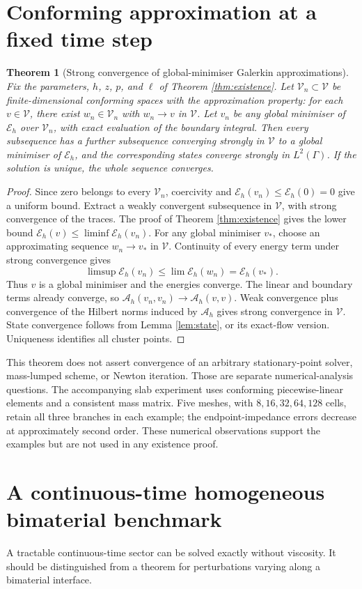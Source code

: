 \documentclass[11pt,a4paper]{article}
\newtheorem{theorem}{Theorem}[section]
\theoremstyle{definition}\newtheorem{definition}[theorem]{Definition}
\theoremstyle{remark}\newtheorem{remark}[theorem]{Remark}
\newcommand{\A}{\mathcal A}
\newcommand{\E}{\mathcal E}
\newcommand{\V}{\mathcal V}
\numberwithin{equation}{section}
\begin{document}
\section{Conforming approximation at a fixed time step}\label{sec:Galerkin}
\begin{theorem}[Strong convergence of global-minimiser Galerkin approximations]\label{thm:Galerkin}
Fix the parameters, $h$, $z$, $p$, and $\ell$ of Theorem \ref{thm:existence}. Let $\V_n\subset\V$ be finite-dimensional conforming spaces with the approximation property: for each $v\in\V$, there exist $w_n\in\V_n$ with $w_n\to v$ in $\V$. Let $v_n$ be any global minimiser of $\E_h$ over $\V_n$, with exact evaluation of the boundary integral. Then every subsequence has a further subsequence converging strongly in $\V$ to a global minimiser of $\E_h$, and the corresponding states converge strongly in $L^2(\Gamma)$. If the solution is unique, the whole sequence converges.
\end{theorem}
\begin{proof}
Since zero belongs to every $\V_n$, coercivity and $\E_h(v_n)\le\E_h(0)=0$ give a uniform bound. Extract a weakly convergent subsequence in $\V$, with strong convergence of the traces. The proof of Theorem \ref{thm:existence} gives the lower bound
$\E_h(v)\le\liminf\E_h(v_n)$.
For any global minimiser $v_*$, choose an approximating sequence $w_n\to v_*$ in $\V$. Continuity of every energy term under strong convergence gives
\[
 \limsup\E_h(v_n)\le\lim\E_h(w_n)=\E_h(v_*).
\]
Thus $v$ is a global minimiser and the energies converge. The linear and boundary terms already converge, so $\A_h(v_n,v_n)\to\A_h(v,v)$. Weak convergence plus convergence of the Hilbert norms induced by $\A_h$ gives strong convergence in $\V$. State convergence follows from Lemma \ref{lem:state}, or its exact-flow version. Uniqueness identifies all cluster points.
\end{proof}
This theorem does not assert convergence of an arbitrary stationary-point solver, mass-lumped scheme, or Newton iteration. Those are separate numerical-analysis questions. The accompanying slab experiment uses conforming piecewise-linear elements and a consistent mass matrix. Five meshes, with $8,16,32,64,128$ cells, retain all three branches in each example; the endpoint-impedance errors decrease at approximately second order. These numerical observations support the examples but are not used in any existence proof.

\section{A continuous-time homogeneous bimaterial benchmark}\label{sec:characteristic}
A tractable continuous-time sector can be solved exactly without viscosity. It should be distinguished from a theorem for perturbations varying along a bimaterial interface.
\end{document}
